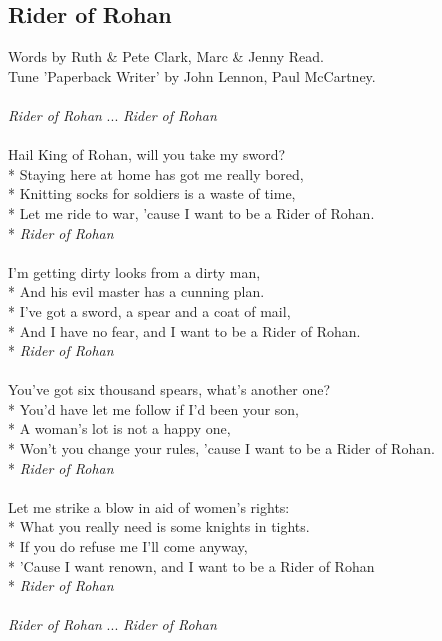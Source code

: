 \begin{multicols}{2}
\section{Rider of Rohan}
Words by Ruth \& Pete Clark, Marc \& Jenny Read.
\\
Tune 'Paperback Writer' by John Lennon, Paul McCartney.
\\
\\
\textit{Rider of Rohan} ... \textit{Rider of Rohan}
\\
\\
Hail King of Rohan, will you take my sword?
\\*
Staying here at home has got me really bored,
\\*
Knitting socks for soldiers is a waste of time,
\\*
Let me ride to war, ’cause I want to be a Rider of
Rohan.
\\*
\textit{Rider of Rohan}
\\
\\
I’m getting dirty looks from a dirty man,
\\*
And his evil master has a cunning plan.
\\*
I’ve got a sword, a spear and a coat of mail,
\\*
And I have no fear, and I want to be a Rider of Rohan.
\\*
\textit{Rider of Rohan}
\\
\\
You’ve got six thousand spears, what’s another one?
\\*
You’d have let me follow if I’d been your son,
\\*
A woman’s lot is not a happy one,
\\*
Won’t you change your rules, ’cause I want to be a Rider of Rohan.
\\*
\textit{Rider of Rohan}
\\
\\
Let me strike a blow in aid of women’s rights:
\\*
What you really need is some knights in tights.
\\*
If you do refuse me I’ll come anyway,
\\*
'Cause I want renown, and I want to be a Rider of Rohan
\\*
\textit{Rider of Rohan}
\\
\\
\textit{Rider of Rohan} ... \textit{Rider of Rohan}
\\
\\
\\
\end{multicols}